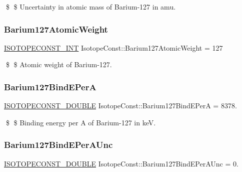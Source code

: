 \$ \$ Uncertainty in atomic mass of Barium-\/127 in amu. \mbox{\label{group___isotope_const-_barium-_ba127_ga90e246bb0c8ab9031761530752aed33e}} 
\subsubsection{\texorpdfstring{Barium127\+Atomic\+Weight}{Barium127AtomicWeight}}
{\footnotesize\ttfamily \mbox{\hyperlink{group___isotope_const-_macros_ga5f18360b3e99483a35c32d789e62621c}{I\+S\+O\+T\+O\+P\+E\+C\+O\+N\+S\+T\+\_\+\+I\+NT}} Isotope\+Const\+::\+Barium127\+Atomic\+Weight = 127}

\$ \$ Atomic weight of Barium-\/127. \mbox{\label{group___isotope_const-_barium-_ba127_ga8d8aa280e24ffcc04f4908f8c44ba04e}} 
\subsubsection{\texorpdfstring{Barium127\+Bind\+E\+PerA}{Barium127BindEPerA}}
{\footnotesize\ttfamily \mbox{\hyperlink{group___isotope_const-_macros_ga8f45a7272ce02c0b4c65c44636ed719a}{I\+S\+O\+T\+O\+P\+E\+C\+O\+N\+S\+T\+\_\+\+D\+O\+U\+B\+LE}} Isotope\+Const\+::\+Barium127\+Bind\+E\+PerA = 8378.}

\$ \$ Binding energy per A of Barium-\/127 in keV. \mbox{\label{group___isotope_const-_barium-_ba127_gafd43d9e4184eac62b51aa683c902bdae}} 
\subsubsection{\texorpdfstring{Barium127\+Bind\+E\+Per\+A\+Unc}{Barium127BindEPerAUnc}}
{\footnotesize\ttfamily \mbox{\hyperlink{group___isotope_const-_macros_ga8f45a7272ce02c0b4c65c44636ed719a}{I\+S\+O\+T\+O\+P\+E\+C\+O\+N\+S\+T\+\_\+\+D\+O\+U\+B\+LE}} Isotope\+Const\+::\+Barium127\+Bind\+E\+Per\+A\+Unc = 0.}

